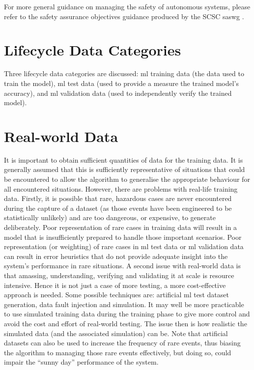 For more general guidance on managing the safety of autonomous systems, please refer to the safety assurance objectives guidance produced by the SCSC \gls{saswg} \cite{citation:SASWG:Objectives}.

\section{Lifecycle Data Categories}
Three lifecycle data categories are discussed: \gls{ml} training data (the data used to train the model),
\gls{ml} test data (used to provide a measure the trained model's \gls{accuracy}), and \gls{ml}
validation data (used to independently verify the trained model).  

\section{Real-world Data}
It is important to obtain sufficient quantities of data for the training data. It is generally assumed that this is sufficiently representative of situations that could be encountered to allow the algorithm to generalise the appropriate behaviour for all encountered situations.  However, there are problems with real-life training data. Firstly, it is possible that rare, hazardous cases are never encountered during the capture of a \gls{dataset} (as those events have been engineered to be statistically unlikely) and are too dangerous, or expensive, to generate deliberately. Poor representation of rare cases in training data will result in a model that is insufficiently prepared to handle those important scenarios. Poor representation (or weighting) of rare cases in
\gls{ml} test data or \gls{ml}
validation data can result in error heuristics that do not provide adequate insight into the system’s performance in rare situations. A second issue with real-world data is that amassing, understanding, verifying and validating it at scale is resource intensive.
Hence it is not just a case of more testing, a more cost-effective approach is needed. Some possible techniques are: artificial
\gls{ml}
test \gls{dataset} generation, data fault injection and simulation. It may well be more practicable to use simulated training data during the training phase to give more control and avoid the cost and effort of real-world testing. The issue then is how realistic the simulated data (and the associated simulation) can be. Note that artificial \glspl{dataset} can also be used to increase the frequency of rare events, thus biasing the algorithm to managing those rare events effectively, but doing so, could impair the ``sunny day'' performance of the system.

